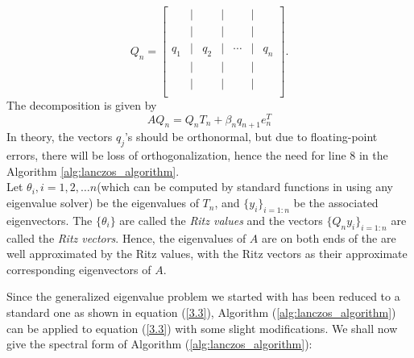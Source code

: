 	\[
	Q_n = 
	\begin{bmatrix}
		 & \big| &  & \big| &  & \big| &  \\
		 & \big| &  & \big| &  & \big| &  \\
		 q_1 & \big| & q_2 & \big| & \cdots & \big| & q_n \\
		 & \big| &  & \big| &  & \big| &  \\
		 & \big| &  & \big| &  & \big| &  \\
	\end{bmatrix}.
	\]
The decomposition is given by
\begin{equation}
	AQ_n = Q_nT_n + \beta_{n}q_{n+1}e_n^T
\end{equation}
In theory, the vectors $q_j$'s should be orthonormal, but due to floating-point errors, there will be loss of orthogonalization, hence the need for line 8 in the Algorithm \ref{alg:lanczos_algorithm}.\\
Let $\theta_i, i = 1,2, \ldots n$(which can be computed by standard functions in using any eigenvalue solver) be the eigenvalues of $T_n$, and $\{y_i\}_{i = 1 : n}$ be the associated eigenvectors. The $\{\theta_i\}$ are called the \textit{Ritz values} and the vectors $\{Q_ny_i\}_{i = 1 : n}$ are called the \textit{Ritz vectors}. Hence, the eigenvalues of $A$ are on both ends of the are well approximated by the Ritz values, with the Ritz vectors as their approximate corresponding eigenvectors of $A$.\par
Since the generalized eigenvalue problem we started with has been reduced to a standard one as shown in equation (\ref{3.3}), Algorithm (\ref{alg:lanczos_algorithm}) can be applied to equation (\ref{3.3}) with some slight modifications. We shall now give the spectral form of Algorithm (\ref{alg:lanczos_algorithm}):\\
